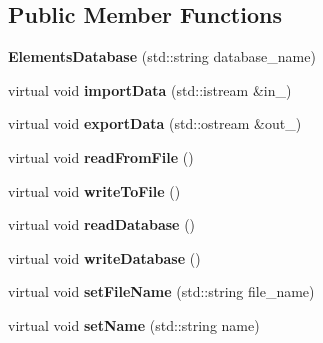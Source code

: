\subsection*{Public Member Functions}
\begin{DoxyCompactItemize}
\item 
\mbox{\label{class_elements_database_ae370a45ab1134db34ff1a66263d8297b}} 
{\bfseries Elements\+Database} (std\+::string database\+\_\+name)
\item 
\mbox{\label{class_elements_database_a881af95023218e1382edc0577ec5ef23}} 
virtual void {\bfseries import\+Data} (std\+::istream \&in\+\_\+)
\item 
\mbox{\label{class_elements_database_a0aec9b8628c2402a4d78d4be5b3ef6f2}} 
virtual void {\bfseries export\+Data} (std\+::ostream \&out\+\_\+)
\item 
\mbox{\label{class_elements_database_a55558c7804a272361f152dc2e0b3a4c8}} 
virtual void {\bfseries read\+From\+File} ()
\item 
\mbox{\label{class_elements_database_a3db3ee74d96dfd50c186588ff578e308}} 
virtual void {\bfseries write\+To\+File} ()
\item 
\mbox{\label{class_elements_database_a642d59a3e44b0d183523e313065309d4}} 
virtual void {\bfseries read\+Database} ()
\item 
\mbox{\label{class_elements_database_a2c18f21690c1b45b37ae825d545a5e36}} 
virtual void {\bfseries write\+Database} ()
\item 
\mbox{\label{class_elements_database_ae2c31aa4cb49c37462814fed64aec560}} 
virtual void {\bfseries set\+File\+Name} (std\+::string file\+\_\+name)
\item 
\mbox{\label{class_elements_database_a8710cd2dad7a2c3c97509daee656f5c6}} 
virtual void {\bfseries set\+Name} (std\+::string name)
\item 
\mbox{\label{class_elements_database_ad2ff356da8d6148ad30b828f91a61605}} 

\end{DoxyCompactItemize}
